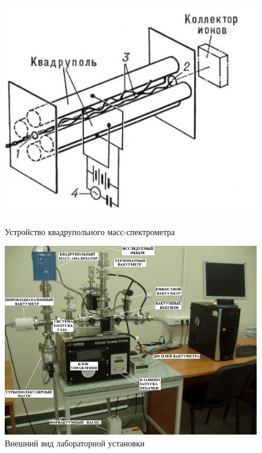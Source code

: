 \documentclass[a4paper]{article}
\begin{document}
\begin{figure}[h]
\begin{center}
\begin{minipage}[h]{0.4\linewidth}
\includegraphics[width=1\linewidth]{quadrup.PNG}
\caption{Устройство квадрупольного масс-спектрометра } %
\end{minipage}
\hfill 
\begin{minipage}[h]{0.7\linewidth}
\includegraphics[width=1\linewidth]{fig3.PNG}
\caption{Внешний вид лабораторной установки }
\label{ris:experimcoded}
\end{minipage}
\end{center}
\end{figure}
\end{document}
